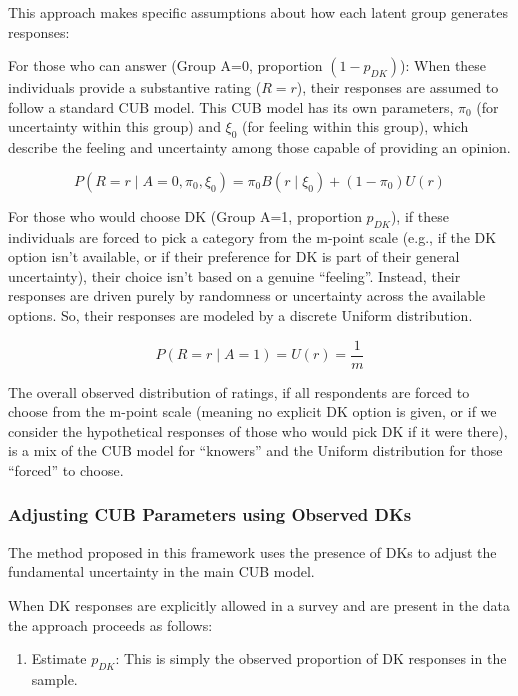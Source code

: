 \documentclass[
  letterpaper,
  DIV=11,
  numbers=noendperiod]{scrartcl}
\providecommand{\tightlist}{%
  \setlength{\itemsep}{0pt}\setlength{\parskip}{0pt}}\usepackage{longtable,booktabs,array}
\begin{document}
This approach makes specific assumptions about how each latent group
generates responses:

For those who can answer (Group A=0, proportion \((1-p_{DK})\)): When
these individuals provide a substantive rating (\(R=r\)), their
responses are assumed to follow a standard CUB model. This CUB model has
its own parameters, \(\pi_0\) (for uncertainty within this group) and
\(\xi_0\) (for feeling within this group), which describe the feeling
and uncertainty among those capable of providing an opinion.

\[
P(R = r \mid A = 0, \pi_0, \xi_0) = \pi_0B(r\mid\xi_0) + (1-\pi_0)U(r)
\]

For those who would choose DK (Group A=1, proportion \(p_{DK}\)), if
these individuals are forced to pick a category from the m-point scale
(e.g., if the DK option isn't available, or if their preference for DK
is part of their general uncertainty), their choice isn't based on a
genuine ``feeling''. Instead, their responses are driven purely by
randomness or uncertainty across the available options. So, their
responses are modeled by a discrete Uniform distribution.

\[
P(R = r\mid A =1) =U(r)= \frac{1}{m}
\]

The overall observed distribution of ratings, if all respondents are
forced to choose from the m-point scale (meaning no explicit DK option
is given, or if we consider the hypothetical responses of those who
would pick DK if it were there), is a mix of the CUB model for
``knowers'' and the Uniform distribution for those ``forced'' to choose.

\hypertarget{adjusting-cub-parameters-using-observed-dks}{%
\subsubsection{Adjusting CUB Parameters using Observed
DKs}\label{adjusting-cub-parameters-using-observed-dks}}

The method proposed in this framework uses the presence of DKs to adjust
the fundamental uncertainty in the main CUB model.

When DK responses are explicitly allowed in a survey and are present in
the data the approach proceeds as follows:

\begin{enumerate}
\def\labelenumi{\arabic{enumi}.}
\tightlist
\item
  Estimate \(p_{DK}\): This is simply the observed proportion of DK
  responses in the sample.
\end{enumerate}
\end{document}
